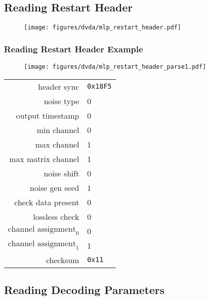 \clearpage

\subsection{Reading Restart Header}
\label{mlp:readrestartheader}
{
  
}

\begin{figure}[h]
  \texttt{[image: figures/dvda/mlp\_restart\_header.pdf]}
\end{figure}

\clearpage

\subsubsection{Reading Restart Header Example}

\begin{figure}[h]
  \texttt{[image: figures/dvda/mlp\_restart\_header\_parse1.pdf]}
\end{figure}
\begin{table}[h]
{
  \begin{tabular}{rl}
    header sync & \texttt{0x18F5} \\
    noise type & 0 \\
    output timestamp & 0 \\
    min channel & 0 \\
    max channel & 1 \\
    max matrix channel & 1 \\
    noise shift & 0 \\
    noise gen seed & 1 \\
    check data present & 0 \\
    lossless check & 0 \\
    $\text{channel assignment}_0$ & 0 \\
    $\text{channel assignment}_1$ & 1 \\
    checksum & \texttt{0x11} \\
  \end{tabular}
}
\end{table}

\clearpage

\subsection{Reading Decoding Parameters}
\label{mlp:readdecodingparams}
{
  
}

